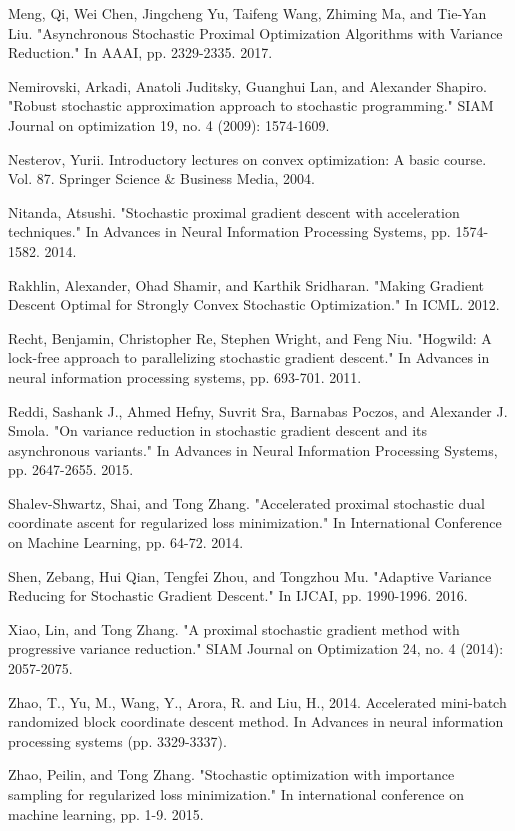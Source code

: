 \documentclass[10pt, conference, compsocconf]{IEEEtran}
\theoremstyle{definition}
\theoremstyle{remark}
\begin{document}
\begin{thebibliography}{99}
 Meng, Qi, Wei Chen, Jingcheng Yu, Taifeng Wang, Zhiming Ma, and Tie-Yan Liu. "Asynchronous Stochastic Proximal Optimization Algorithms with Variance Reduction." In AAAI, pp. 2329-2335. 2017. 

 Nemirovski, Arkadi, Anatoli Juditsky, Guanghui Lan, and Alexander Shapiro. "Robust stochastic approximation approach to stochastic programming." SIAM Journal on optimization 19, no. 4 (2009): 1574-1609.

 Nesterov, Yurii. Introductory lectures on convex optimization: A basic course. Vol. 87. Springer Science $\&$ Business Media, 2004.

Nitanda, Atsushi. "Stochastic proximal gradient descent with acceleration techniques." In Advances in Neural Information Processing Systems, pp. 1574-1582. 2014.

 Rakhlin, Alexander, Ohad Shamir, and Karthik Sridharan. "Making Gradient Descent Optimal for Strongly Convex Stochastic Optimization." In ICML. 2012.

 Recht, Benjamin, Christopher Re, Stephen Wright, and Feng Niu. "Hogwild: A lock-free approach to parallelizing stochastic gradient descent." In Advances in neural information processing systems, pp. 693-701. 2011.

 Reddi, Sashank J., Ahmed Hefny, Suvrit Sra, Barnabas Poczos, and Alexander J. Smola. "On variance reduction in stochastic gradient descent and its asynchronous variants." In Advances in Neural Information Processing Systems, pp. 2647-2655. 2015. 

 Shalev-Shwartz, Shai, and Tong Zhang. "Accelerated proximal stochastic dual coordinate ascent for regularized loss minimization." In International Conference on Machine Learning, pp. 64-72. 2014.

 Shen, Zebang, Hui Qian, Tengfei Zhou, and Tongzhou Mu. "Adaptive Variance Reducing for Stochastic Gradient Descent." In IJCAI, pp. 1990-1996. 2016.

 Xiao, Lin, and Tong Zhang. "A proximal stochastic gradient method with progressive variance reduction." SIAM Journal on Optimization 24, no. 4 (2014): 2057-2075.

 Zhao, T., Yu, M., Wang, Y., Arora, R. and Liu, H., 2014. Accelerated mini-batch randomized block coordinate descent method. In Advances in neural information processing systems (pp. 3329-3337).

 Zhao, Peilin, and Tong Zhang. "Stochastic optimization with importance sampling for regularized loss minimization." In international conference on machine learning, pp. 1-9. 2015.


\end{thebibliography}
\end{document}
